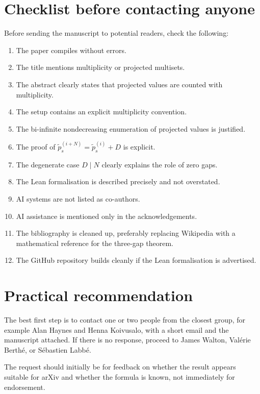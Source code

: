 \documentclass[11pt]{article}
\begin{document}
\section*{Checklist before contacting anyone}

Before sending the manuscript to potential readers, check the following:

\begin{enumerate}
    \item The paper compiles without errors.
    \item The title mentions multiplicity or projected multisets.
    \item The abstract clearly states that projected values are counted with
    multiplicity.
    \item The setup contains an explicit multiplicity convention.
    \item The bi-infinite nondecreasing enumeration of projected values is
    justified.
    \item The proof of \(\tilde p_s^{(i+N)}=\tilde p_s^{(i)}+D\) is explicit.
    \item The degenerate case \(D\mid N\) clearly explains the role of zero
    gaps.
    \item The Lean formalisation is described precisely and not overstated.
    \item AI systems are not listed as co-authors.
    \item AI assistance is mentioned only in the acknowledgements.
    \item The bibliography is cleaned up, preferably replacing Wikipedia with
    a mathematical reference for the three-gap theorem.
    \item The GitHub repository builds cleanly if the Lean formalisation is
    advertised.
\end{enumerate}

\section*{Practical recommendation}

The best first step is to contact one or two people from the closest group,
for example Alan Haynes and Henna Koivusalo, with a short email and the
manuscript attached.  If there is no response, proceed to James Walton,
Val\'{e}rie Berth\'{e}, or S\'{e}bastien Labb\'{e}.

The request should initially be for feedback on whether the result appears
suitable for arXiv and whether the formula is known, not immediately for
endorsement.
\end{document}
